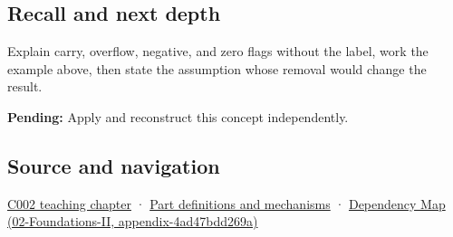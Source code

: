 \subsection{Recall and next depth}\label{appendix-8d687c9c08ab-recall-and-next-depth}

Explain carry, overflow, negative, and zero flags without the label, work the example above, then state the assumption whose removal would change the result.

\textbf{Pending:} Apply and reconstruct this concept independently.

\subsection{Source and navigation}\label{appendix-8d687c9c08ab-source-and-navigation}

\hyperref[01-foundations-i-ch001-arithmetic-becomes-a-policy]{C002 teaching chapter} · \hyperref[appendix-fd090d982a15]{Part definitions and mechanisms} · \href{../02-Foundations-II/main.pdf\#nameddest=appendix-4ad47bdd269a}{Dependency Map (02-Foundations-II, appendix-4ad47bdd269a)}
